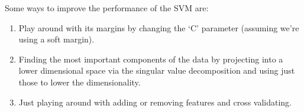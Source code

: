 \documentclass[11pt, parindent=0]{article}
\begin{document}
Some ways to improve the performance of the SVM are:
\begin{enumerate}[1.]
    \item Play around with its margins by changing the `C' parameter (assuming we're using a soft margin).

    \item Finding the most important components of the data by projecting into a lower dimensional space via the singular value decomposition and using just those to lower the dimensionality.

    \item Just playing around with adding or removing features and cross validating.
\end{enumerate}
\end{document}
